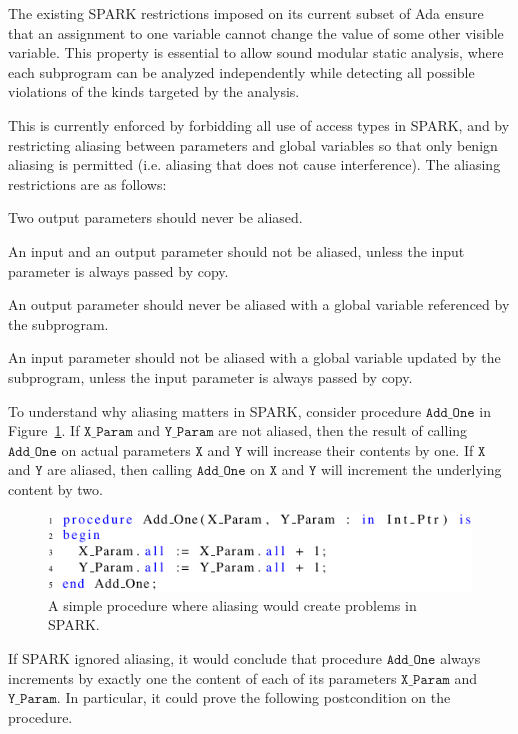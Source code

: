 \documentclass{llncs}
\newcommand\var[1]{\ensuremath{\mathtt{#1}}}
\begin{document}
The existing SPARK restrictions imposed on its current subset of Ada ensure that an assignment to one variable cannot change the value of some other visible variable. This property is essential to allow sound modular static analysis,
where each subprogram can be analyzed independently while detecting all possible violations of the kinds targeted by the analysis.

This is currently enforced by forbidding all use of access types in SPARK, and by restricting aliasing between parameters and global variables so that only
benign aliasing is permitted (i.e. aliasing that does not cause interference).  The aliasing restrictions are as follows:

\begin{compactitem}
  \item Two output parameters should never be aliased.
  \item An input and an output parameter should not be aliased, unless the input parameter is always passed by copy.
  \item An output parameter should never be aliased with a global variable referenced by the subprogram.
  \item An input parameter should not be aliased with a global variable updated by the subprogram, unless the input parameter is always passed by copy.
\end{compactitem}

\smallskip
To understand why aliasing matters in SPARK, consider procedure \var{Add\_One} in Figure~\ref{fig:spark_ex1}. If \var{X\_Param} and \var{Y\_Param}
are not aliased, then the result of calling \var{Add\_One} on actual parameters \var{X} and \var{Y} will increase their contents by one. If \var{X} and \var{Y} are aliased, then calling
\var{Add\_One} on \var{X} and \var{Y} will increment the underlying content by two.


\begin{figure}[htb!]
\centering
  \captionsetup{justification=centering,margin=0.6cm}
   \includegraphics[]{spark_ex1}
   \caption{A simple procedure where aliasing would create problems in SPARK.}
   \label{fig:spark_ex1}
\end{figure}

If SPARK ignored aliasing, it would conclude that procedure \var{Add\_One} always increments by exactly one the content of each of its parameters \var{X\_Param} and \var{Y\_Param}.
In particular, it could prove the following postcondition on the procedure.
\end{document}

